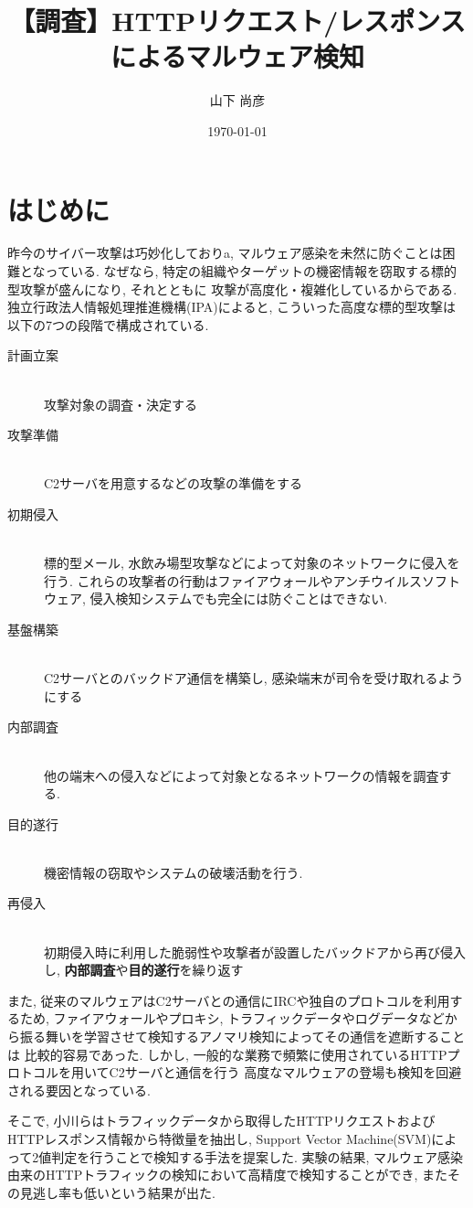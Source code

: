 \documentclass[twocolumn,10pt]{ltjsarticle}
\title{【調査】HTTPリクエスト/レスポンスによるマルウェア検知}
\author{山下 尚彦}
\date{\today}
\begin{document}
\maketitle

\section{はじめに}
昨今のサイバー攻撃は巧妙化しておりa, マルウェア感染を未然に防ぐことは困難となっている. 
なぜなら, 特定の組織やターゲットの機密情報を窃取する標的型攻撃が盛んになり, それとともに
攻撃が高度化・複雑化しているからである. 独立行政法人情報処理推進機構(IPA)によると, 
こういった高度な標的型攻撃は以下の7つの段階で構成されている\cite{IPA2014高度標的型攻撃}. 

\begin{description}
    \item[計画立案]~\\
    攻撃対象の調査・決定する

    \item[攻撃準備]~\\
    C2サーバを用意するなどの攻撃の準備をする 

    \item[初期侵入]~\\
    標的型メール, 水飲み場型攻撃などによって対象のネットワークに侵入を行う. 
    これらの攻撃者の行動はファイアウォールやアンチウイルスソフトウェア, 侵入検知システムでも完全には防ぐことはできない. 
    
    \item[基盤構築]~\\
    C2サーバとのバックドア通信を構築し, 感染端末が司令を受け取れるようにする

    \item[内部調査]~\\
    他の端末への侵入などによって対象となるネットワークの情報を調査する. 

    \item[目的遂行]~\\
    機密情報の窃取やシステムの破壊活動を行う. 

    \item[再侵入]~\\ 
    初期侵入時に利用した脆弱性や攻撃者が設置したバックドアから再び侵入し, 
    \textbf{内部調査}や\textbf{目的遂行}を繰り返す
\end{description}

また, 従来のマルウェアはC2サーバとの通信にIRCや独自のプロトコルを利用するため, ファイアウォールやプロキシ, 
トラフィックデータやログデータなどから振る舞いを学習させて検知するアノマリ検知によってその通信を遮断することは
比較的容易であった. しかし, 一般的な業務で頻繁に使用されているHTTPプロトコルを用いてC2サーバと通信を行う
高度なマルウェアの登場も検知を回避される要因となっている. \par
そこで, 小川らはトラフィックデータから取得したHTTPリクエストおよびHTTPレスポンス情報から特徴量を抽出し, 
Support Vector Machine(SVM)によって2値判定を行うことで検知する手法を提案した\cite{小川秀貴2016リクエスト間隔}. 
実験の結果, マルウェア感染由来のHTTPトラフィックの検知において高精度で検知することができ, 
またその見逃し率も低いという結果が出た. 
\end{document}
